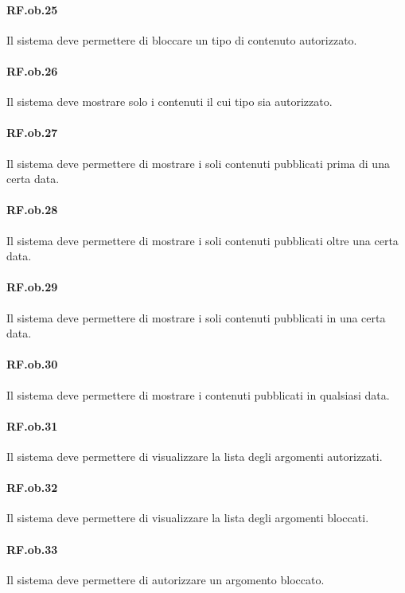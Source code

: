\documentclass[10pt,a4paper,headinclude,footinclude,hidelinks]{scrreprt} %
\begin{document}
	\paragraph{RF.ob.25} Il sistema deve permettere di bloccare un tipo di contenuto autorizzato.

	\paragraph{RF.ob.26} Il sistema deve mostrare solo i contenuti il cui tipo sia autorizzato.

	\paragraph{RF.ob.27} Il sistema deve permettere di mostrare i soli contenuti pubblicati prima di una certa data.

	\paragraph{RF.ob.28} Il sistema deve permettere di mostrare i soli contenuti pubblicati oltre una certa data.

	\paragraph{RF.ob.29} Il sistema deve permettere di mostrare i soli contenuti pubblicati in una certa data.

	\paragraph{RF.ob.30} Il sistema deve permettere di mostrare i contenuti pubblicati in qualsiasi data.

	\paragraph{RF.ob.31} Il sistema deve permettere di visualizzare la lista degli argomenti autorizzati.

	\paragraph{RF.ob.32} Il sistema deve permettere di visualizzare la lista degli argomenti bloccati.

	\paragraph{RF.ob.33} Il sistema deve permettere di autorizzare un argomento bloccato.
\end{document}
